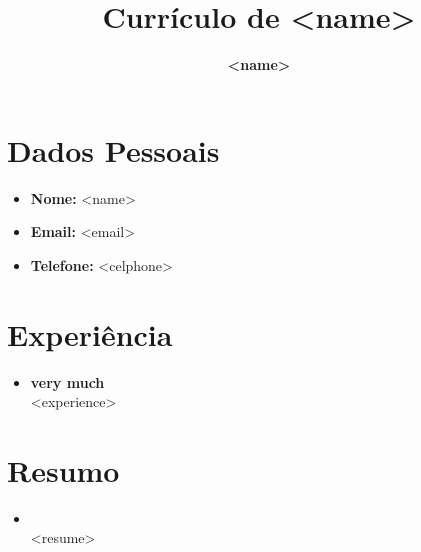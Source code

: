 \documentclass[a4paper,10pt]{article}
\title{Currículo de \textbf{<name>}}
\author{\textbf{<name>}}
\date{}
\begin{document}
\maketitle

\section*{Dados Pessoais}
\begin{itemize}[label={}]
    \item \textbf{Nome:} <name>
    \item \textbf{Email:} <email>
    \item \textbf{Telefone:} <celphone>
\end{itemize}

\section*{Experiência}
\begin{itemize}
    \item \textbf{very much} \\
    <experience>
\end{itemize}

\section*{Resumo}
\begin{itemize}
    \item \textbf{} \\
    <resume>
\end{itemize}
\end{document}
